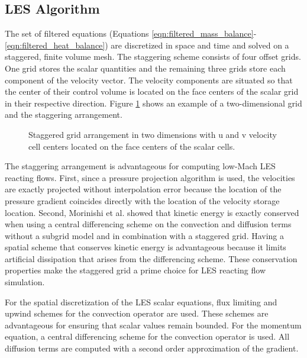 \subsection{LES Algorithm}\label{Sec:LES_Algorithm}
%
The set of filtered equations (Equations \ref{eqn:filtered_mass_balance}-\ref{eqn:filtered_heat_balance}) are discretized in space and time and solved on a staggered, finite volume mesh.  The staggering scheme consists of four offset grids. One grid stores the scalar quantities and the remaining three grids store each component of the velocity vector. The velocity components are situated so that the center of their control volume is located on the face centers of the scalar grid in their respective direction.  Figure \ref{fig:staggered_grid} shows an example of a two-dimensional grid and the staggering arrangement.
%
\begin{figure}
 \begin{center}
   \caption{Staggered grid arrangement in two dimensions with u and v velocity cell centers located on the face centers of the scalar cells.}\label{fig:staggered_grid}
   \end{center}
\end{figure}
%

The staggering arrangement is advantageous for computing low-Mach LES reacting flows.  First, since a pressure projection algorithm is used, the velocities are exactly projected without interpolation error because the location of the pressure gradient coincides directly with the location of the velocity storage location. Second, Morinishi et al. \cite{morinishi98} showed that kinetic energy is exactly conserved when using a central differencing scheme on the convection and diffusion terms without a subgrid model and in combination with a staggered grid.  Having a spatial scheme that conserves kinetic energy is advantageous because it limits artificial dissipation that arises from the differencing scheme.  These conservation properties make the staggered grid a prime choice for LES reacting flow simulation.

For the spatial discretization of the LES scalar equations, flux limiting and upwind schemes for the convection operator are used.  These schemes are advantageous for ensuring that scalar values remain bounded.  For the momentum equation, a central differencing scheme for the convection operator is used.  All diffusion terms are computed with a second order approximation of the gradient.  

